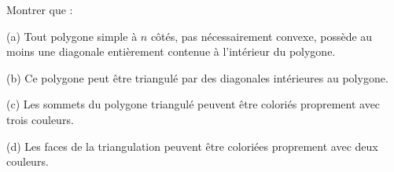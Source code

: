 Montrer que :

(a) Tout polygone simple à $n$ côtés, pas nécessairement convexe, possède au moins une diagonale entièrement contenue à l'intérieur du polygone.

(b) Ce polygone peut être triangulé par des diagonales intérieures au polygone.

(c) Les sommets du polygone triangulé peuvent être coloriés proprement avec trois couleurs.

(d) Les faces de la triangulation peuvent être coloriées proprement avec deux couleurs.
